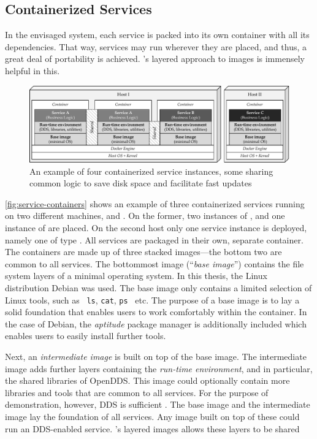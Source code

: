 %
%
%
%
%
%
%
%
%
%
%
\subsection{Containerized Services}
In the envisaged system, each service is packed into its own container with all its dependencies. That way, services may run wherever they are placed, and thus, a great deal of portability is achieved. \docker 's layered approach to images is immensely helpful in this.
\begin{figure}[htpb]
  \centering
  \includegraphics[width=\textwidth]{figures/docker-sharing}
  \caption[An example of containerized services]{An example of four containerized service instances, some sharing common logic to save disk space and facilitate fast updates}\label{fig:service-containers} 
\end{figure}
\autoref{fig:service-containers} shows an example of three containerized services running on two different machines,  and . On the former, two instances of , and one instance of  are placed. On the second host only one service instance is deployed, namely one of type . All services are packaged in their own, separate container. The containers are made up of three stacked images---the bottom two are common to all services. The bottommost image (``\emph{base image}'') contains the file system layers of a minimal operating system. In this thesis, the Linux distribution Debian was used. The base image only contains a limited selection of Linux tools, such as \ \texttt{ls}, \texttt{cat}, \texttt{ps} \ etc. The purpose of a base image is to lay a solid foundation that enables users to work comfortably within the container. In the case of Debian, the \emph{aptitude} package manager is additionally included which enables users to easily install further tools. 

Next, an \emph{intermediate image} is built on top of the base image. The intermediate image adds further layers containing the \emph{run-time environment}, and in particular, the shared libraries of OpenDDS. This image could optionally contain more libraries and tools that are common to all services. For the purpose of demonstration, however, DDS is sufficient . The base image and the intermediate image lay the foundation of all services. Any image built on top of these could run an DDS-enabled service. \docker 's layered images allows these layers to be shared 

